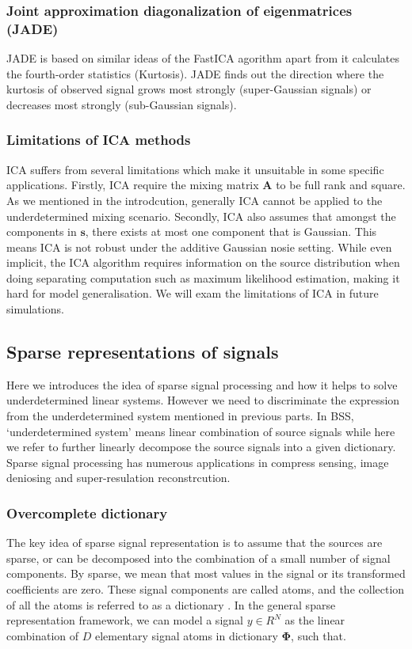 \subsubsection{Joint approximation diagonalization of
eigenmatrices (JADE)}
JADE is based on similar ideas of the FastICA agorithm apart from it calculates the fourth-order statistics (Kurtosis). JADE finds out the direction where the kurtosis of observed signal grows most strongly (super-Gaussian signals) or decreases most strongly (sub-Gaussian signals).

\subsubsection{Limitations of ICA methods}
\label{ica_defect}
ICA suffers from several limitations which make it unsuitable in some specific applications. Firstly, ICA require the mixing matrix $\mathbf{A}$ to be full rank and square. As we mentioned in the introdcution, generally ICA cannot be applied to the underdetermined mixing scenario. Secondly, ICA also assumes that amongst the components in $\mathbf{s}$, there exists at most one component that is Gaussian. This means ICA is not robust under the additive Gaussian nosie setting. While even implicit, the ICA algorithm requires information on the source distribution when doing separating computation such as maximum likelihood estimation, making it hard for model generalisation. We will exam the limitations of ICA in future simulations.

\subsection{Sparse representations of signals}
Here we introduces the idea of sparse signal processing and how it helps to solve underdetermined linear systems. However we need to discriminate the expression from the underdetermined system mentioned in previous parts. In BSS, `underdetermined system' means linear combination of source signals while here we refer to further linearly decompose the source signals into a given dictionary. Sparse signal processing has numerous applications in compress sensing, image deniosing and super-resulation reconstrcution.

\subsubsection{Overcomplete dictionary}
\label{over_dict}
The key idea of sparse signal representation is to assume
that the sources are sparse, or can be decomposed into the
combination of a small number of signal components. By
sparse, we mean that most values in the signal or its transformed coefficients are zero. These signal components are called atoms, and the collection of all the atoms is referred to as a dictionary \cite{Mallat_Zhang1993}. In the general sparse representation framework, we can model a signal $y \in R^N$ as the linear combination of $D$ elementary signal atoms in dictionary $\mathbf{\Phi}$, such that.

